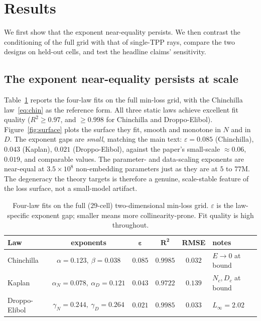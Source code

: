 \documentclass[11pt]{article}
\begin{document}
\section{Results}
\label{sec:results}

We first show that the exponent near-equality persists. We then contrast the conditioning of the
full grid with that of single-TPP rays, compare the two designs on held-out cells, and test the
headline claims' sensitivity.

\subsection{The exponent near-equality persists at scale}

Table~\ref{tab:fits} reports the four-law fits on the full min-loss grid, with the Chinchilla
law~\eqref{eq:chin} as the reference form. All three static laws achieve excellent fit quality
($R^2\ge0.97$, and $\ge0.998$ for Chinchilla and Droppo-Elibol). Figure~\ref{fig:surface} plots
the surface they fit, smooth and monotone in $N$ and in $D$. The exponent gaps are \emph{small},
matching the main text: $\varepsilon=0.085$
(Chinchilla), $0.043$ (Kaplan), $0.021$ (Droppo-Elibol), against the paper's small-scale
$\approx0.06$, $0.019$, and comparable values. The parameter- and data-scaling exponents are
near-equal at $3.5\times10^{8}$ non-embedding parameters just as they are at $5$ to $77$M. The
degeneracy the theory targets is therefore a genuine, scale-stable feature of the loss surface,
not a small-model artifact.

\begin{table}[t]
\centering
\caption{Four-law fits on the full ($29$-cell) two-dimensional min-loss grid. $\varepsilon$ is the
law-specific exponent gap; smaller means more collinearity-prone. Fit quality is high throughout.}
\label{tab:fits}
\begin{tabular}{lccccl}
\toprule
\textbf{Law} & \textbf{exponents} & $\boldsymbol{\varepsilon}$ & $\boldsymbol{R^2}$ &
\textbf{RMSE} & \textbf{notes}\\
\midrule
Chinchilla     & $\alpha{=}0.123,\ \beta{=}0.038$              & $0.085$ & $0.9985$ & $0.032$ & $E\!\to\!0$ at bound\\
Kaplan         & $\alpha_N{=}0.078,\ \alpha_D{=}0.121$         & $0.043$ & $0.9722$ & $0.139$ & $N_c,D_c$ at bound\\
Droppo-Elibol  & $\gamma_N{=}0.244,\ \gamma_D{=}0.264$         & $0.021$ & $0.9985$ & $0.033$ & $L_\infty{=}2.02$\\
\bottomrule
\end{tabular}
\end{table}
\end{document}

